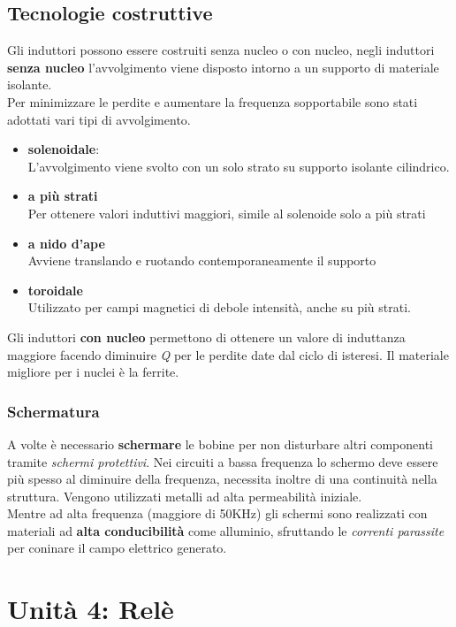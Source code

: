 \documentclass{article}
\begin{document}
\subsection{Tecnologie costruttive}
Gli induttori possono essere costruiti senza nucleo o con nucleo,
negli induttori \textbf{senza nucleo} l'avvolgimento viene disposto intorno a un supporto di materiale isolante.\\
Per minimizzare le perdite e aumentare la frequenza sopportabile sono stati adottati vari tipi di avvolgimento.
\begin{itemize}
    \item \textbf{solenoidale}:\\
    L'avvolgimento viene svolto con un solo strato su supporto isolante cilindrico.
    \item \textbf{a più strati} \\
    Per ottenere valori induttivi maggiori, simile al solenoide solo a più strati
    \item \textbf{a nido d'ape} \\
    Avviene translando e ruotando contemporaneamente il supporto 
    \item \textbf{toroidale}\\
    Utilizzato per campi magnetici di debole intensità, anche su più strati.
\end{itemize}
Gli induttori \textbf{con nucleo} permettono di ottenere un valore di induttanza maggiore facendo diminuire \emph{Q} per le perdite date dal ciclo di isteresi.
Il materiale migliore per i nuclei è la ferrite.
\subsubsection{Schermatura}
A volte è necessario \textbf{schermare} le bobine per non disturbare altri componenti tramite \textit{schermi protettivi}.
Nei circuiti a bassa frequenza lo schermo deve essere più spesso al diminuire della frequenza, necessita inoltre di una continuità nella struttura. Vengono utilizzati metalli ad alta permeabilità iniziale.\\
Mentre ad alta frequenza (maggiore di 50KHz) gli schermi sono realizzati con materiali ad \textbf{alta conducibilità} come alluminio, sfruttando le \emph{correnti parassite} per coninare il campo elettrico generato.

\section{Unità 4: Relè}
\end{document}
